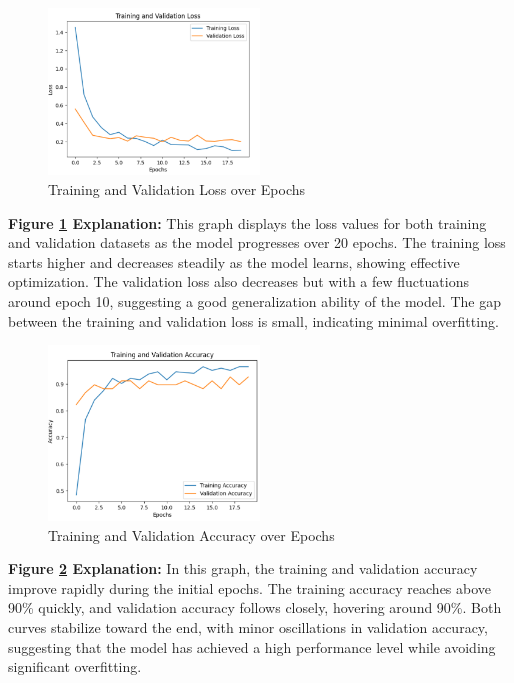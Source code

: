\documentclass[conference]{IEEEtran}
\begin{document}
\begin{figure}[h!]
    \centering
    \includegraphics[width=0.5\textwidth]{Training and Validation Loss over Epochs.png}
    \caption{Training and Validation Loss over Epochs}
    \label{fig:training_validation_loss}
\end{figure}

\textbf{Figure \ref{fig:training_validation_loss} Explanation:}
This graph displays the loss values for both training and validation datasets as the model progresses over 20 epochs. The training loss starts higher and decreases steadily as the model learns, showing effective optimization. The validation loss also decreases but with a few fluctuations around epoch 10, suggesting a good generalization ability of the model. The gap between the training and validation loss is small, indicating minimal overfitting.

\begin{figure}[h!]
    \centering
    \includegraphics[width=0.5\textwidth]{Training and Validation Accuracy over Epochs.png}
    \caption{Training and Validation Accuracy over Epochs}
    \label{fig:training_validation_accuracy}
\end{figure}

\textbf{Figure \ref{fig:training_validation_accuracy} Explanation:}
In this graph, the training and validation accuracy improve rapidly during the initial epochs. The training accuracy reaches above 90\% quickly, and validation accuracy follows closely, hovering around 90\%. Both curves stabilize toward the end, with minor oscillations in validation accuracy, suggesting that the model has achieved a high performance level while avoiding significant overfitting.
\end{document}
